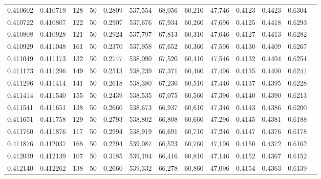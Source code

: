 \begin{tabular}{rrrrrrrrrrrrr}
0.410602 & 0.410719 &   128 &  50 &                                     0.2809 & 537,554 &  68,056 &  60,210 &  47,746 & 0.4123 & 0.4423 & 0.6304 \\
0.410722 & 0.410807 &   122 &  50 &                                     0.2907 & 537,676 &  67,934 &  60,260 &  47,696 & 0.4125 & 0.4418 & 0.6293 \\
0.410808 & 0.410928 &   121 &  50 &                                     0.2924 & 537,797 &  67,813 &  60,310 &  47,646 & 0.4127 & 0.4413 & 0.6282 \\
0.410929 & 0.411048 &   161 &  50 &                                     0.2370 & 537,958 &  67,652 &  60,360 &  47,596 & 0.4130 & 0.4409 & 0.6267 \\
0.411049 & 0.411173 &   132 &  50 &                                     0.2747 & 538,090 &  67,520 &  60,410 &  47,546 & 0.4132 & 0.4404 & 0.6254 \\
0.411173 & 0.411296 &   149 &  50 &                                     0.2513 & 538,239 &  67,371 &  60,460 &  47,496 & 0.4135 & 0.4400 & 0.6241 \\
0.411296 & 0.411414 &   141 &  50 &                                     0.2618 & 538,380 &  67,230 &  60,510 &  47,446 & 0.4137 & 0.4395 & 0.6228 \\
0.411414 & 0.411540 &   155 &  50 &                                     0.2439 & 538,535 &  67,075 &  60,560 &  47,396 & 0.4140 & 0.4390 & 0.6213 \\
0.411541 & 0.411651 &   138 &  50 &                                     0.2660 & 538,673 &  66,937 &  60,610 &  47,346 & 0.4143 & 0.4386 & 0.6200 \\
0.411651 & 0.411758 &   129 &  50 &                                     0.2793 & 538,802 &  66,808 &  60,660 &  47,296 & 0.4145 & 0.4381 & 0.6188 \\
0.411760 & 0.411876 &   117 &  50 &                                     0.2994 & 538,919 &  66,691 &  60,710 &  47,246 & 0.4147 & 0.4376 & 0.6178 \\
0.411876 & 0.412037 &   168 &  50 &                                     0.2294 & 539,087 &  66,523 &  60,760 &  47,196 & 0.4150 & 0.4372 & 0.6162 \\
0.412039 & 0.412139 &   107 &  50 &                                     0.3185 & 539,194 &  66,416 &  60,810 &  47,146 & 0.4152 & 0.4367 & 0.6152 \\
0.412140 & 0.412262 &   138 &  50 &                                     0.2660 & 539,332 &  66,278 &  60,860 &  47,096 & 0.4154 & 0.4363 & 0.6139 \\

\end{tabular}
